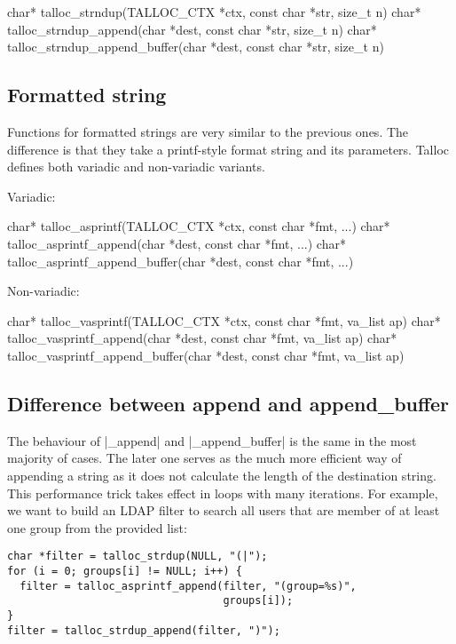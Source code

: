 \begin{funcproto}
char* talloc_strndup(TALLOC_CTX *ctx, const char *str,
                     size_t n)
char* talloc_strndup_append(char *dest, const char *str,
                            size_t n)
char* talloc_strndup_append_buffer(char *dest, const char
                                   *str, size_t n)
\end{funcproto}

\subsection{Formatted string}

Functions for formatted strings are very similar to the previous ones. The
difference is that they take a printf-style format string and its parameters.
Talloc defines both variadic and non-variadic variants.

Variadic:
\begin{funcproto}
char* talloc_asprintf(TALLOC_CTX *ctx, const char *fmt, ...)
char* talloc_asprintf_append(char *dest, const char *fmt,
                             ...)
char* talloc_asprintf_append_buffer(char *dest, const char
                                    *fmt, ...)
\end{funcproto}

Non-variadic:
\begin{funcproto}
char* talloc_vasprintf(TALLOC_CTX *ctx, const char *fmt,
                       va_list ap)
char* talloc_vasprintf_append(char *dest, const char *fmt,
                              va_list ap)
char* talloc_vasprintf_append_buffer(char *dest, const char
                                     *fmt, va_list ap)
\end{funcproto}

\subsection{Difference between append and append_buffer}

The behaviour of |_append| and |_append_buffer| is the same in the most majority
of cases. The later one serves as the much more efficient way of appending a
string as it does not calculate the length of the destination string. This
performance trick takes effect in loops with many iterations. For example, we
want to build an LDAP filter to search all users that are member of at least one
group from the provided list:

\begin{lstlisting}[caption={Appending a string},label={lst:append_buffer}]
char *filter = talloc_strdup(NULL, "(|");
for (i = 0; groups[i] != NULL; i++) {
  filter = talloc_asprintf_append(filter, "(group=%s)",
                                  groups[i]);
}
filter = talloc_strdup_append(filter, ")");
\end{lstlisting}

